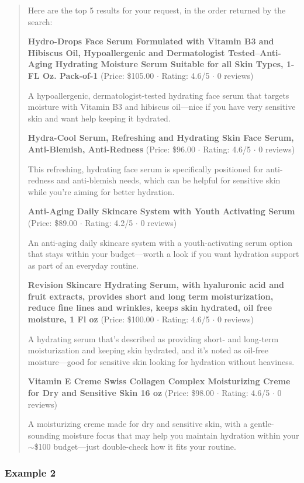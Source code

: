 \documentclass{article}
\begin{document}
\begin{quote}
Here are the top 5 results for your request, in the order returned by the search:

\textbf{Hydro-Drops Face Serum Formulated with Vitamin B3 and Hibiscus Oil, Hypoallergenic and Dermatologist Tested--Anti-Aging Hydrating Moisture Serum Suitable for all Skin Types, 1-FL Oz. Pack-of-1} (Price: \$105.00 $\cdot$ Rating: 4.6/5 $\cdot$ 0 reviews)

A hypoallergenic, dermatologist-tested hydrating face serum that targets moisture with Vitamin B3 and hibiscus oil---nice if you have very sensitive skin and want help keeping it hydrated.

\textbf{Hydra-Cool Serum, Refreshing and Hydrating Skin Face Serum, Anti-Blemish, Anti-Redness} (Price: \$96.00 $\cdot$ Rating: 4.6/5 $\cdot$ 0 reviews)

This refreshing, hydrating face serum is specifically positioned for anti-redness and anti-blemish needs, which can be helpful for sensitive skin while you’re aiming for better hydration.

\textbf{Anti-Aging Daily Skincare System with Youth Activating Serum} (Price: \$89.00 $\cdot$ Rating: 4.2/5 $\cdot$ 0 reviews)

An anti-aging daily skincare system with a youth-activating serum option that stays within your budget---worth a look if you want hydration support as part of an everyday routine.

\textbf{Revision Skincare Hydrating Serum, with hyaluronic acid and fruit extracts, provides short and long term moisturization, reduce fine lines and wrinkles, keeps skin hydrated, oil free moisture, 1 Fl oz} (Price: \$100.00 $\cdot$ Rating: 4.6/5 $\cdot$ 0 reviews)

A hydrating serum that’s described as providing short- and long-term moisturization and keeping skin hydrated, and it’s noted as oil-free moisture---good for sensitive skin looking for hydration without heaviness.

\textbf{Vitamin E Creme Swiss Collagen Complex Moisturizing Creme for Dry and Sensitive Skin 16 oz} (Price: \$98.00 $\cdot$ Rating: 4.6/5 $\cdot$ 0 reviews)

A moisturizing creme made for dry and sensitive skin, with a gentle-sounding moisture focus that may help you maintain hydration within your $\sim$\$100 budget---just double-check how it fits your routine.
\end{quote}

\subsubsection*{Example 2}
\end{document}
